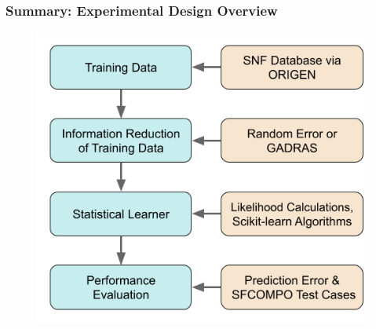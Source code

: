 
\begin{frame}
  \frametitle{Summary: Experimental Design Overview}
  \begin{figure}
    \centering
    \includegraphics[width=\textwidth]{./figures/methodology.png}
  \end{figure}
\end{frame}

